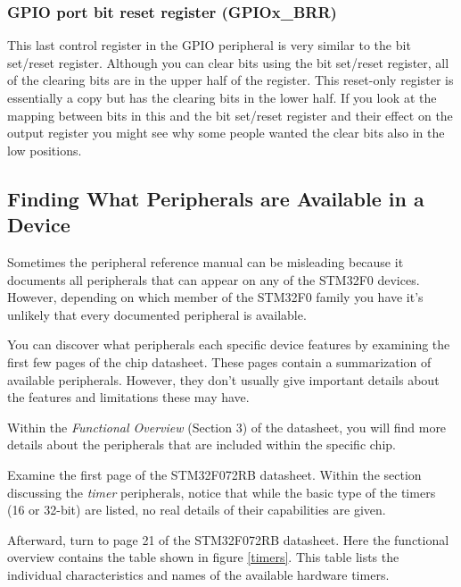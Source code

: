 \documentclass[11pt,fleqn]{book} %
\begin{document}
\subsubsection{GPIO port bit reset register (GPIOx\_BRR)}
This last control register in the GPIO peripheral is very similar to the bit set/reset register. Although you can clear bits using the bit set/reset register, all of the clearing bits are in the upper half of the register. This reset-only register is essentially a copy but has the clearing bits in the lower half. If you look at the mapping between bits in this and the bit set/reset register and their effect on the output register you might see why some people wanted the clear bits also in the low positions.

\subsection{Finding What Peripherals are Available in a Device}

Sometimes the peripheral reference manual can be misleading because it documents all peripherals that can appear on any of the STM32F0 devices. However, depending on which member of the STM32F0 family you have it's unlikely that every documented peripheral is available.

You can discover what peripherals each specific device features by examining the first few pages of the chip datasheet. These pages contain a summarization of available peripherals. However, they don't usually give important details about the features and limitations these may have. 

Within the \textit{Functional Overview} (Section 3) of the datasheet, you will find more details about the peripherals that are included within the specific chip. 

\begin{example}
    Examine the first page of the STM32F072RB datasheet. Within the section discussing the \textit{timer} peripherals, notice that while the basic type of the timers (16 or 32-bit) are listed, no real details of their capabilities are given. 
    
    Afterward, turn to page 21 of the STM32F072RB datasheet. Here the functional overview contains the table shown in figure \vref{timers}. This table lists the individual characteristics and names of the available hardware timers.
\end{example}
\end{document}
